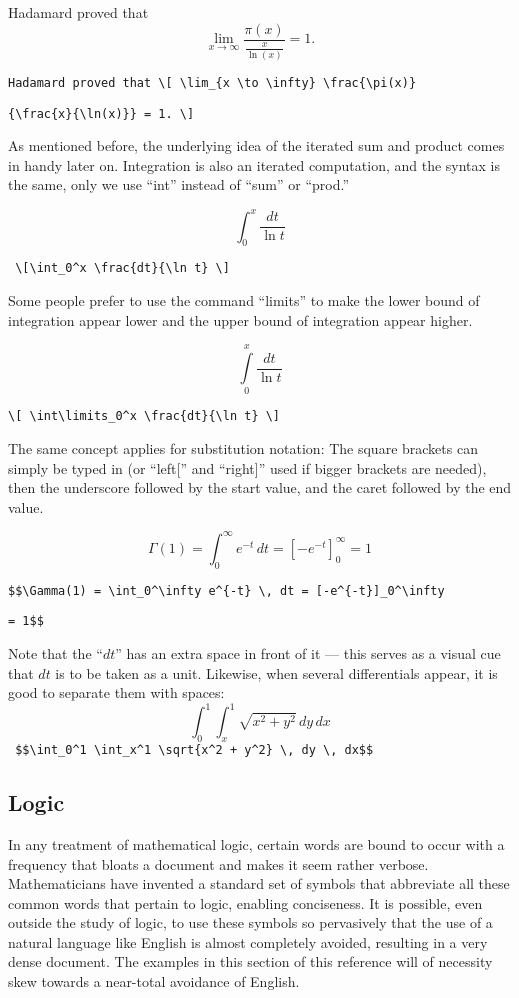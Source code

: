 \medskip
Hadamard proved that \[ \lim_{x \to \infty} \frac{\pi(x)}{\frac{x}{\ln(x)}} = 1. \]

\verb'Hadamard proved that \[ \lim_{x \to \infty} \frac{\pi(x)}'

\verb'{\frac{x}{\ln(x)}} = 1. \]'

\bigskip

As mentioned before, the underlying idea of the iterated sum and product comes in handy later on. Integration is also an iterated computation, and the syntax is the same, only we use ``int'' instead of ``sum'' or ``prod.''

\[ \int_0^x \frac{dt}{\ln t} \]

\verb' \[\int_0^x \frac{dt}{\ln t} \]'

\bigskip

Some people prefer to use the command ``limits'' to make the lower bound of integration appear lower and the upper bound of integration appear higher.

\[ \int\limits_0^x \frac{dt}{\ln t} \]

\verb'\[ \int\limits_0^x \frac{dt}{\ln t} \]'

\bigskip

The same concept applies for substitution notation: The square brackets can simply be typed in (or ``left['' and ``right]'' used if bigger brackets are needed), then the underscore followed by the start value, and the caret followed by the end value.

\[ \Gamma(1) = \int_0^\infty e^{-t} \,dt = [-e^{-t}]_0^\infty = 1 \]

\verb'$$\Gamma(1) = \int_0^\infty e^{-t} \, dt = [-e^{-t}]_0^\infty'

\verb'= 1$$'

\bigskip

Note that the ``$dt$'' has an extra space in front of it --- this serves as
a visual cue that $dt$ is to be taken as a unit. Likewise, when several
differentials appear, it is good to separate them with spaces:
$$\int_0^1 \int_x^1 \sqrt{x^2 + y^2} \, dy \, dx$$
\verb' $$\int_0^1 \int_x^1 \sqrt{x^2 + y^2} \, dy \, dx$$'

\subsection{Logic}

In any treatment of mathematical logic, certain words are bound to occur with a frequency that bloats a document and makes it seem rather verbose. Mathematicians have invented a standard set of symbols that abbreviate all these common words that pertain to logic, enabling conciseness. It is possible, even outside the study of logic, to use these symbols so pervasively that the use of a natural language like English is almost completely avoided, resulting in a very dense document.  The examples in this section of this reference will of necessity skew towards a near-total avoidance of English.

